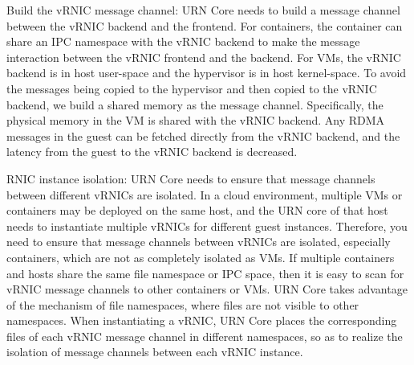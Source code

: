 Build the vRNIC message channel: URN Core needs to build a message channel between the vRNIC backend and the frontend. For containers, the container can share an IPC namespace with the vRNIC backend to make the message interaction between the vRNIC frontend and the backend. For VMs, the vRNIC backend is in host user-space and the hypervisor is in host kernel-space. To avoid the messages being copied to the hypervisor and then copied to the vRNIC backend, we build a shared memory as the message channel. Specifically, the physical memory in the VM is shared with the vRNIC backend. Any RDMA messages in the guest can be fetched directly from the vRNIC backend, and the latency from the guest to the vRNIC backend is decreased.

RNIC instance isolation: URN Core needs to ensure that message channels between different vRNICs are isolated. In a cloud environment, multiple VMs or containers may be deployed on the same host, and the URN core of that host needs to instantiate multiple vRNICs for different guest instances. Therefore, you need to ensure that message channels between vRNICs are isolated, especially containers, which are not as completely isolated as VMs. If multiple containers and hosts share the same file namespace or IPC space, then it is easy to scan for vRNIC message channels to other containers or VMs. URN Core takes advantage of the mechanism of file namespaces, where files are not visible to other namespaces. When instantiating a vRNIC, URN Core places the corresponding files of each vRNIC message channel in different namespaces, so as to realize the isolation of message channels between each vRNIC instance.

